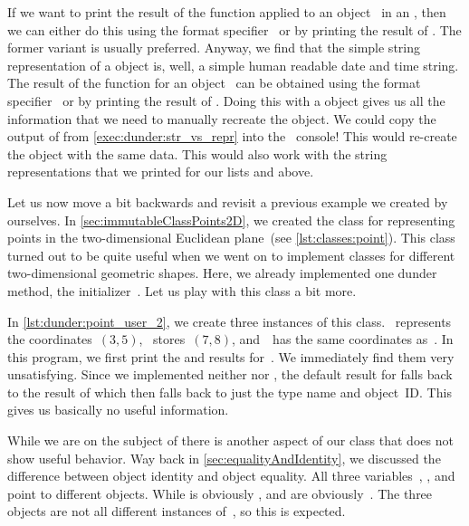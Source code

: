 If we want to print the result of the  function applied to an object~ in an , then we can either do this using the format specifier~ or by printing the result of .
The former variant is usually preferred.
Anyway, we find that the simple string representation of a  object is, well, a simple human readable date and time string.
The result of the function  for an object~ can be obtained using the format specifier~ or by printing the result of .
Doing this with a  object gives us all the information that we need to manually recreate the object.
We could copy the output of  from \cref{exec:dunder:str_vs_repr} into the \python\ console!
This would re-create the  object with the same data.
This would also work with the string representations that we printed for our lists  and  above.

%
%
Let us now move a bit backwards and revisit a previous example we created by ourselves.
In \cref{sec:immutableClassPoints2D}, we created the class  for representing points in the two-dimensional Euclidean plane~(see \cref{lst:classes:point}).
This class turned out to be quite useful when we went on to implement classes for different two-dimensional geometric shapes.
Here, we already implemented one dunder method, the initializer~.
Let us play with this class a bit more.

In \cref{lst:dunder:point_user_2}, we create three instances of this class.
~represents the coordinates~$(3,5)$, ~stores~$(7, 8)$, and~~has the same coordinates as~.
In this program, we first print the  and  results for~.
We immediately find them very unsatisfying.
Since we implemented neither  nor , the default result for  falls back to the result of  which then falls back to just the type name and object~ID.
This gives us basically no useful information.

While we are on the subject of  there is another aspect of our  class that does not show useful behavior.
Way back in \cref{sec:equalityAndIdentity}, we discussed the difference between object identity and object equality.
All three variables~, , and~ point to different objects.
While  is obviously ,  and  are obviously~.
The three objects are not all different instances of~, so this is expected.

